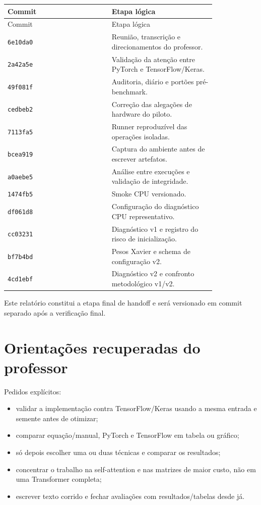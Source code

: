 \begin{longtable}{@{}>{\RaggedRight\arraybackslash}p{0.410\linewidth}>{\RaggedRight\arraybackslash}p{0.410\linewidth}@{}}
\toprule
Commit & Etapa lógica \\
\midrule
\endfirsthead
\toprule
Commit & Etapa lógica \\
\midrule
\endhead
\texttt{6e10da0} & Reunião, transcrição e direcionamentos do professor. \\
\texttt{2a42a5e} & Validação da atenção entre PyTorch e TensorFlow/Keras. \\
\texttt{49f081f} & Auditoria, diário e portões pré-benchmark. \\
\texttt{cedbeb2} & Correção das alegações de hardware do piloto. \\
\texttt{7113fa5} & Runner reproduzível das operações isoladas. \\
\texttt{bcea919} & Captura do ambiente antes de escrever artefatos. \\
\texttt{a0aebe5} & Análise entre execuções e validação de integridade. \\
\texttt{1474fb5} & Smoke CPU versionado. \\
\texttt{df061d8} & Configuração do diagnóstico CPU representativo. \\
\texttt{cc03231} & Diagnóstico v1 e registro do risco de inicialização. \\
\texttt{bf7b4bd} & Pesos Xavier e schema de configuração v2. \\
\texttt{4cd1ebf} & Diagnóstico v2 e confronto metodológico v1/v2. \\
\bottomrule
\end{longtable}




Este relatório constitui a etapa final de handoff e será versionado em commit separado após a verificação final.



\section{Orientações recuperadas do professor}



Pedidos explícitos:


\begin{itemize}
\item validar a implementação contra TensorFlow/Keras usando a mesma entrada e
semente antes de otimizar;
\item comparar equação/manual, PyTorch e TensorFlow em tabela ou gráfico;
\item só depois escolher uma ou duas técnicas e comparar os resultados;
\item concentrar o trabalho na self-attention e nas matrizes de maior custo, não em
uma Transformer completa;
\item escrever texto corrido e fechar avaliações com resultados/tabelas desde já.
\end{itemize}


